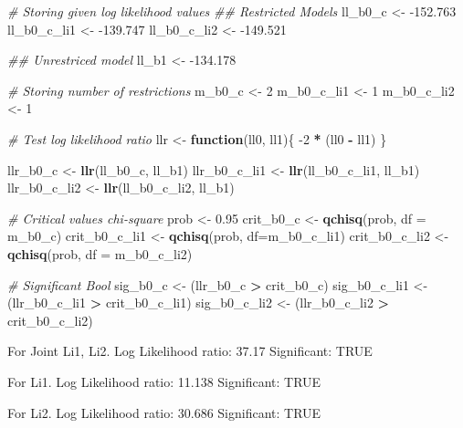 \documentclass[]{article}
\newenvironment{Shaded}{\begin{snugshade}}{\end{snugshade}}
\newcommand{\CommentTok}[1]{\textcolor[rgb]{0.56,0.35,0.01}{\textit{#1}}}
\newcommand{\ControlFlowTok}[1]{\textcolor[rgb]{0.13,0.29,0.53}{\textbf{#1}}}
\newcommand{\DataTypeTok}[1]{\textcolor[rgb]{0.13,0.29,0.53}{#1}}
\newcommand{\DecValTok}[1]{\textcolor[rgb]{0.00,0.00,0.81}{#1}}
\newcommand{\FloatTok}[1]{\textcolor[rgb]{0.00,0.00,0.81}{#1}}
\newcommand{\KeywordTok}[1]{\textcolor[rgb]{0.13,0.29,0.53}{\textbf{#1}}}
\newcommand{\NormalTok}[1]{#1}
\newcommand{\OperatorTok}[1]{\textcolor[rgb]{0.81,0.36,0.00}{\textbf{#1}}}
\newcommand{\StringTok}[1]{\textcolor[rgb]{0.31,0.60,0.02}{#1}}
\begin{document}
\begin{Shaded}
\begin{Highlighting}[]
\CommentTok{# Storing given log likelihood values}
\CommentTok{## Restricted Models}
\NormalTok{ll_b0_c <-}\StringTok{ }\FloatTok{-152.763}
\NormalTok{ll_b0_c_li1 <-}\StringTok{ }\FloatTok{-139.747}
\NormalTok{ll_b0_c_li2 <-}\StringTok{ }\FloatTok{-149.521}

\CommentTok{## Unrestriced model}
\NormalTok{ll_b1 <-}\StringTok{ }\FloatTok{-134.178}

\CommentTok{# Storing number of restrictions}
\NormalTok{m_b0_c <-}\StringTok{ }\DecValTok{2}
\NormalTok{m_b0_c_li1 <-}\StringTok{ }\DecValTok{1}
\NormalTok{m_b0_c_li2 <-}\StringTok{ }\DecValTok{1}

\CommentTok{# Test log likelihood ratio}
\NormalTok{llr <-}\StringTok{ }\ControlFlowTok{function}\NormalTok{(ll0, ll1)\{}
  \DecValTok{-2} \OperatorTok{*}\StringTok{ }\NormalTok{(ll0 }\OperatorTok{-}\StringTok{ }\NormalTok{ll1)}
\NormalTok{\}}

\NormalTok{llr_b0_c <-}\StringTok{ }\KeywordTok{llr}\NormalTok{(ll_b0_c, ll_b1)}
\NormalTok{llr_b0_c_li1 <-}\StringTok{ }\KeywordTok{llr}\NormalTok{(ll_b0_c_li1, ll_b1)}
\NormalTok{llr_b0_c_li2 <-}\StringTok{ }\KeywordTok{llr}\NormalTok{(ll_b0_c_li2, ll_b1)}

\CommentTok{# Critical values chi-square}
\NormalTok{prob <-}\StringTok{ }\FloatTok{0.95}
\NormalTok{crit_b0_c <-}\StringTok{ }\KeywordTok{qchisq}\NormalTok{(prob, }\DataTypeTok{df =}\NormalTok{ m_b0_c)}
\NormalTok{crit_b0_c_li1 <-}\StringTok{ }\KeywordTok{qchisq}\NormalTok{(prob, }\DataTypeTok{df=}\NormalTok{m_b0_c_li1)}
\NormalTok{crit_b0_c_li2 <-}\StringTok{ }\KeywordTok{qchisq}\NormalTok{(prob, }\DataTypeTok{df =}\NormalTok{ m_b0_c_li2)}

\CommentTok{# Significant Bool}
\NormalTok{sig_b0_c <-}\StringTok{ }\NormalTok{(llr_b0_c }\OperatorTok{>}\StringTok{ }\NormalTok{crit_b0_c)}
\NormalTok{sig_b0_c_li1 <-}\StringTok{ }\NormalTok{(llr_b0_c_li1 }\OperatorTok{>}\StringTok{ }\NormalTok{crit_b0_c_li1)}
\NormalTok{sig_b0_c_li2 <-}\StringTok{ }\NormalTok{(llr_b0_c_li2 }\OperatorTok{>}\StringTok{ }\NormalTok{crit_b0_c_li2)}
\end{Highlighting}
\end{Shaded}

For Joint Li1, Li2. Log Likelihood ratio: 37.17 Significant: TRUE

For Li1. Log Likelihood ratio: 11.138 Significant: TRUE

For Li2. Log Likelihood ratio: 30.686 Significant: TRUE
\end{document}
